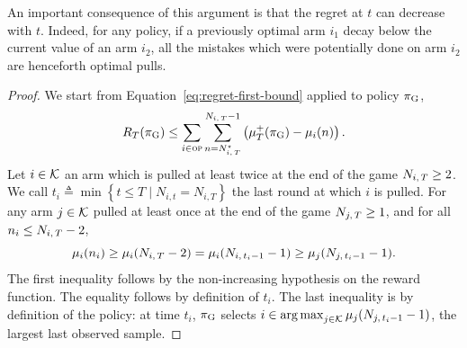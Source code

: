 \begin{remark}
An important consequence of this argument is that the regret at $t$ can decrease with $t$. Indeed, for any policy, if a previously optimal arm $i_1$ decay below the current value of an arm $i_2$, all the mistakes which were potentially done on arm $i_2$ are henceforth optimal pulls. 
\end{remark}
\begin{proof}
We start from Equation~\ref{eq:regret-first-bound} applied to policy $\pi_{\rm G}$,
\begin{equation}
\label{eq:regret-first-bound-GB}
R_T(\pi_{\rm G}) \leq \sum_{i\in \textsc{op}}   \sum_{n=N_{i,\,T}^\star}^{N_{i,\,T}-1} \left(\mu^+_T(\pi_{\rm G}) - \mu_i(n)\right).
\end{equation}
%
Let $i \in \mathcal{K}$ an arm which is pulled at least twice at the end of the game $N_{i,\,T} \geq 2$. We call $t_i \triangleq \min\left\{t\leq T\; |\; N_{i,t} = N_{i,T}\right\}$ the last round at which $i$ is pulled. For any arm  $j \in \mathcal{K}$ pulled at least once at the end of the game $N_{j,\,T} \geq 1$, and for all $n_i \leq N_{i,\,T} -2$, 
\begin{equation}
\label{eq:overpull-GB1}
\mu_i(n_i) \geq \mu_i(N_{i,\,T} - 2 ) = \mu_i(N_{i,\,t_i -1} - 1 ) \geq \mu_j(N_{j,\,t_i-1} - 1).
\end{equation}
The first inequality follows by the non-increasing hypothesis on the reward function. The equality follows by definition of $t_i$. The last inequality is by definition of the policy: at time $t_i$, $\pi_{\rm G}$ selects $i \in \operatorname*{arg\,max}_{j \in \mathcal{K}} \mu_j(N_{j,\,t_i-1}-1)$, the largest last observed sample. 


\end{proof}
